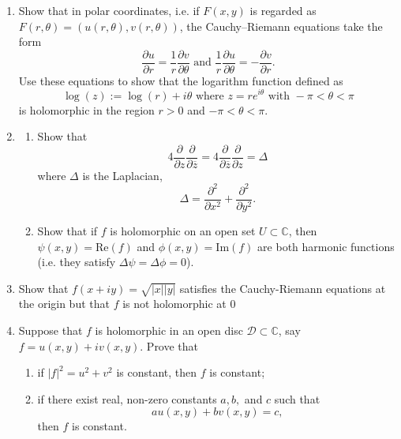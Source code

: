 \documentclass[12pt, reqno]{amsart}
\theoremstyle{definition}
\numberwithin{equation}{subsection}
\newcommand{\rr}{\rightarrow}
\renewcommand{\Re}{\mathrm{Re}}
\renewcommand{\Im}{\mathrm{Im}}
\numberwithin{equation}{section}
\begin{document}
\begin{enumerate}
\begin{enumerate}
\begin{enumerate} 
\item $F$ maps $\mathbb{D}$ to itself and is holomorphic on $\mathbb{D}$
\item $F$ interchanges $0$ and $w$ (i.e. $F(0)=w$ and $F(w)=0$)
\item $|F(z)|=1$ if $|z|=1$
\item $F: \mathbb{D} \rr \mathbb{D}$ is bijective (Hint: calculate $F \circ F$).
\end{enumerate}


\end{enumerate}

\item Show that in polar coordinates, i.e. if $F(x, y)$ is regarded as $F(r, \theta)= ( u(r,\theta), v(r, \theta))$, the Cauchy--Riemann equations take the form  $$ \frac{\partial u}{\partial r}  = \frac{1}{r} \frac{ \partial v}{\partial \theta} \text{ and } \frac{1}{r} \frac{ \partial u}{\partial \theta} = - \frac{\partial v}{\partial r}.$$  Use these equations to show that the logarithm function defined as $$ \log(z) := \log (r) + i \theta \text{ where } z = r e^{ i \theta} \text{ with } - \pi < \theta < \pi $$ is holomorphic in the region $r > 0$ and $- \pi < \theta < \pi$. 

\item \begin{enumerate}
\item Show that $$4 \frac{\partial}{\partial z} \frac{\partial}{\partial \overline{z}} = 4 \frac{\partial}{\partial \overline{z}} \frac{\partial}{\partial z} = \Delta $$ where $\Delta$ is the Laplacian, $$ \Delta = \frac{\partial^2}{\partial x^2} + \frac{\partial^2}{\partial y^2} .$$ \item Show that if $f$ is holomorphic on an open set $U \subset \mathbb{C}$, then $\psi(x, y) = \Re(f)$ and $\phi(x, y) = \Im(f)$ are both harmonic functions (i.e. they satisfy $\Delta \psi = \Delta \phi = 0$).
\end{enumerate}

\item Show that $f(x+ i y) = \sqrt{|x| | y |}$ satisfies the Cauchy-Riemann equations at the origin but that $f$ is not holomorphic at $0$

\item Suppose that $f$ is holomorphic in an open disc $\mathcal{D} \subset \mathbb{C}$, say $f= u(x, y) +  i v(x, y)$. Prove that \begin{enumerate} 
\item if $|f|^2 = u^2 + v^2$ is constant, then $f$ is constant;
\item if there exist real, non-zero constants $a, b,$ and $c$ such that $$ a u (x, y) + b v (x, y) = c, $$ then $f$ is constant. 
\end{enumerate}

\end{enumerate}
\end{document}
